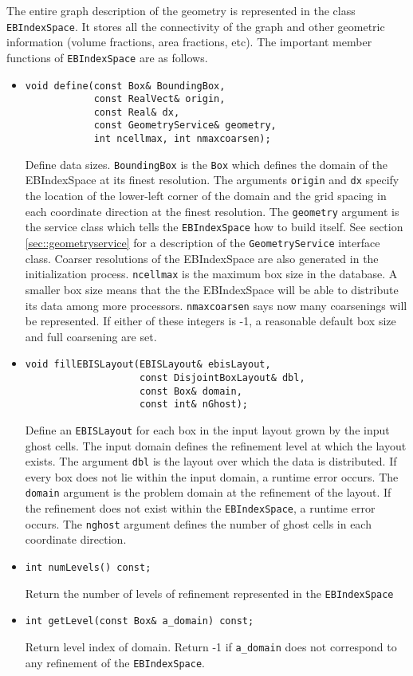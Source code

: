 The entire graph description of the geometry
is represented in the class {\tt EBIndexSpace}.
It stores all the connectivity of the graph and other
geometric information (volume fractions, area fractions, etc).
The important member functions of 
{\tt EBIndexSpace} are as follows.
\begin{itemize}
\item \begin{verbatim}
void define(const Box& BoundingBox,
            const RealVect& origin,
            const Real& dx,
            const GeometryService& geometry,
            int ncellmax, int nmaxcoarsen);
\end{verbatim}
Define data sizes. 
{\tt BoundingBox} is the {\tt Box} which defines the domain of the
EBIndexSpace at its finest resolution.
The arguments {\tt origin} and {\tt dx} specify
the location of the lower-left corner of the domain
and the grid spacing in each coordinate direction at the finest
resolution. The {\tt geometry} argument is the service class 
which tells the {\tt EBIndexSpace} how to build 
itself.  See section \ref{sec::geometryservice} 
for a description of the {\tt GeometryService} interface class.
Coarser resolutions of the EBIndexSpace are also generated in the
initialization process. {\tt ncellmax} is the maximum box size in the
database.  A smaller box size means that the the EBIndexSpace will be
able to distribute its data among more processors. {\tt nmaxcoarsen}
says now many coarsenings will be represented.   If either of these
integers is -1, a reasonable default box size and full coarsening are set.

\item \begin{verbatim}
void fillEBISLayout(EBISLayout& ebisLayout,
                    const DisjointBoxLayout& dbl,
                    const Box& domain,
                    const int& nGhost);
\end{verbatim}
Define an {\tt EBISLayout} for each box in the input layout
grown by the input ghost cells.  The input domain defines
the refinement level at which the layout exists.
The argument \verb/dbl/  is the layout over which the data is
distributed.  If every box does not lie within the input domain,   
a runtime error occurs. The \verb/domain/ argument is the 
problem domain at the refinement of the layout. 
If the refinement does not  exist within the {\tt EBIndexSpace}, 
a runtime error occurs.  The \verb/nghost/  argument defines 
the number of ghost cells in each coordinate direction.

\item \begin{verbatim}
int numLevels() const;
\end{verbatim}
Return the number of levels of refinement represented
in the {\tt EBIndexSpace}

\item \begin{verbatim}
int getLevel(const Box& a_domain) const;
\end{verbatim}
Return level index of domain.
Return -1 if \verb/a_domain/ does not
correspond to any refinement of the {\tt EBIndexSpace}.
\end{itemize}

